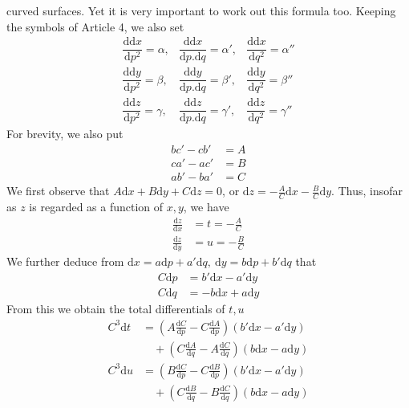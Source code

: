 %
curved surfaces. Yet it is very important to work out this formula too. Keeping the symbols of Article 4, we also set
\[
\begin{array}{lll}
\dfrac{\mathrm{d}\mathrm{d}x}{\mathrm{d}p^2}=\alpha,&\dfrac{\mathrm{d}\mathrm{d}x}{\mathrm{d}p\mathord{.}\mathrm{d}q}=\alpha',&\dfrac{\mathrm{d}\mathrm{d}x}{\mathrm{d}q^2}=\alpha''\\[6pt]
\dfrac{\mathrm{d}\mathrm{d}y}{\mathrm{d}p^2}=\beta,&\dfrac{\mathrm{d}\mathrm{d}y}{\mathrm{d}p\mathord{.}\mathrm{d}q}=\beta',&\dfrac{\mathrm{d}\mathrm{d}y}{\mathrm{d}q^2}=\beta''\\[6pt]
\dfrac{\mathrm{d}\mathrm{d}z}{\mathrm{d}p^2}=\gamma,&\dfrac{\mathrm{d}\mathrm{d}z}{\mathrm{d}p\mathord{.}\mathrm{d}q}=\gamma',&\dfrac{\mathrm{d}\mathrm{d}z}{\mathrm{d}q^2}=\gamma''
\end{array}
\]
For brevity, we also put
\[
\begin{aligned}
bc'-cb'&=A\\
ca'-ac'&=B\\
ab'-ba'&=C
\end{aligned}
\]
We first observe that \(A\mathrm{d}x+B\mathrm{d}y+C\mathrm{d}z=0\), or \(\mathrm{d}z=-\frac{A}{C}\mathrm{d}x-\frac{B}{C}\mathrm{d}y\). Thus, insofar as \(z\) is regarded as a function of \(x,y\), we have
\[
\begin{aligned}
\frac{\mathrm{d}z}{\mathrm{d}x}&=t=-\frac{A}{C}\\
\frac{\mathrm{d}z}{\mathrm{d}y}&=u=-\frac{B}{C}
\end{aligned}
\]
We further deduce from \(\mathrm{d}x=a\mathrm{d}p+a'\mathrm{d}q,\ \mathrm{d}y=b\mathrm{d}p+b'\mathrm{d}q\) that
\[
\begin{aligned}
C\mathrm{d}p&=b'\mathrm{d}x-a'\mathrm{d}y\\
C\mathrm{d}q&=-b\mathrm{d}x+a\mathrm{d}y
\end{aligned}
\]
From this we obtain the total differentials of \(t,u\)
\[
\begin{aligned}
C^3\mathrm{d}t&=(A\tfrac{\mathrm{d}C}{\mathrm{d}p}-C\tfrac{\mathrm{d}A}{\mathrm{d}p})(b'\mathrm{d}x-a'\mathrm{d}y)\\
&\quad +(C\tfrac{\mathrm{d}A}{\mathrm{d}q}-A\tfrac{\mathrm{d}C}{\mathrm{d}q})(b\mathrm{d}x-a\mathrm{d}y)\\
C^3\mathrm{d}u&=(B\tfrac{\mathrm{d}C}{\mathrm{d}p}-C\tfrac{\mathrm{d}B}{\mathrm{d}p})(b'\mathrm{d}x-a'\mathrm{d}y)\\
&\quad +(C\tfrac{\mathrm{d}B}{\mathrm{d}q}-B\tfrac{\mathrm{d}C}{\mathrm{d}q})(b\mathrm{d}x-a\mathrm{d}y)
\end{aligned}
\]
